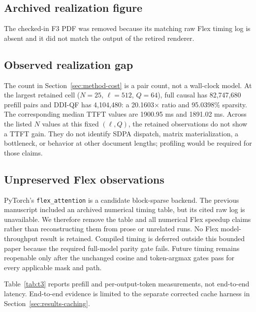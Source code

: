 \begin{table}[t]
\centering
\caption{T3 --- SDPA TTFT, TPOT, and DDI mask sparsity by document count $N$
    at $\ell=512$ and $Q=64$. Values are preserved from the audited Phase~3
    timing store; no end-to-end latency is shown.}
\label{tab:t3}
\end{table}

\subsection{Archived realization figure}
\label{sec:results-efficiency-realization}

The checked-in F3 PDF was removed because its matching raw Flex timing log is
absent and it did not match the output of the retired renderer.

\subsection{Observed realization gap}
\label{sec:results-efficiency-gap}

The count in Section~\ref{sec:method-cost} is a pair count, not a wall-clock
model. At the largest retained cell ($N=25$, $\ell=512$, $Q=64$), full causal
has 82,747,680 prefill pairs and DDI-QF has 4,104,480: a 20.1603$\times$
ratio and 95.0398\% sparsity. The corresponding median TTFT values are
1900.95 ms and 1891.02 ms. Across the listed $N$ values at this fixed
$(\ell,Q)$, the retained observations do not show a TTFT gain. They do not
identify SDPA dispatch, matrix materialization, a bottleneck, or behavior at
other document lengths; profiling would be required for those claims.

\subsection{Unpreserved Flex observations}
\label{sec:results-efficiency-flex}

PyTorch's \texttt{flex\_attention} \cite{flex_attention} is a candidate
block-sparse backend. The previous manuscript included an archived numerical
timing table, but its cited raw log is unavailable. We therefore remove the
table and all numerical Flex speedup claims rather than reconstructing them
from prose or unrelated runs. No Flex model-throughput result is retained.
Compiled timing is deferred outside this bounded paper because the required
full-model parity gate fails. Future timing remains
reopenable only after the unchanged cosine and token-argmax gates pass for every
applicable mask and path.

Table~\ref{tab:t3} reports prefill and per-output-token measurements, not
end-to-end latency. End-to-end evidence is limited to the separate corrected
cache harness in Section~\ref{sec:results-caching}.
